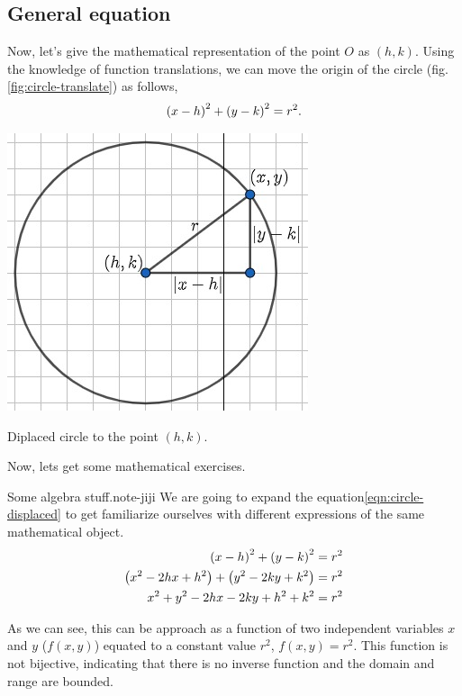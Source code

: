 \documentclass[../main-notes.tex]{subfiles}
\begin{document}
\subsection{General equation}

Now, let's give the mathematical representation of the point $O$ as $(h,k)$.
Using the knowledge of function translations, we can move the origin of the circle (fig.\ref{fig:circle-translate}) as follows,
\begin{gather}
    \qty(x-h)^2 + \qty(y-k)^2 = r^2.\label{eqn:circle-displaced}
\end{gather}

\begin{marginfigure}
    \centering
    \includegraphics[widht=0.45\textwidth]{../Figures/circunference/circle-translate.jpg}
    \caption{Diplaced circle to the point $(h,k)$.}\label{fig:circle-translate}
\end{marginfigure}

Now, lets get some mathematical exercises.

\begin{note}{Some algebra stuff.}{note-jiji}
    We are going to expand the equation\eqref{eqn:circle-displaced} to get familiarize ourselves with different expressions of the same mathematical object.
    \begin{align*}
        \qty(x-h)^2 + \qty(y-k)^2 &= r^2 \\
        \qty(x^2 -2hx + h^2) + \qty(y^2 -2ky + k^2) &= r^2 \\
        x^2 + y^2 -2hx -2ky + h^2 + k^2 &= r^2
    \end{align*}

    As we can see, this can be approach as a function of two independent variables $x$ and $y$ ($f(x,y)$) equated to a constant value $r^2$, $f(x,y)=r^2$.
    This function is not bijective, indicating that there is no inverse function and the domain and range are bounded.

\end{note}




\end{document}

